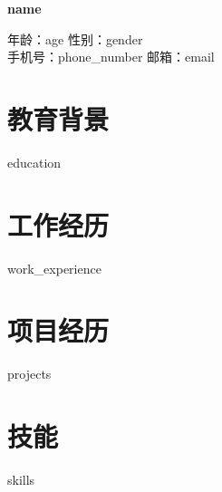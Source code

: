 \documentclass{ctexart}
\begin{document}
\begin{center}
    {\Huge \textbf{{{name}}}}
\end{center}

\begin{center}
    年龄：{{age}} \quad 性别：{{gender}}\\
    手机号：{{phone_number}} \quad 邮箱：{{email}}
\end{center}

\section*{教育背景}
{{education}}

\section*{工作经历}
\begin{itemize}[leftmargin=*]
    {{work_experience}}
\end{itemize}

\section*{项目经历}
\begin{itemize}[leftmargin=*]
    {{projects}}
\end{itemize}

\section*{技能}
\begin{itemize}[leftmargin=*]
    {{skills}}
\end{itemize}
\end{document}
